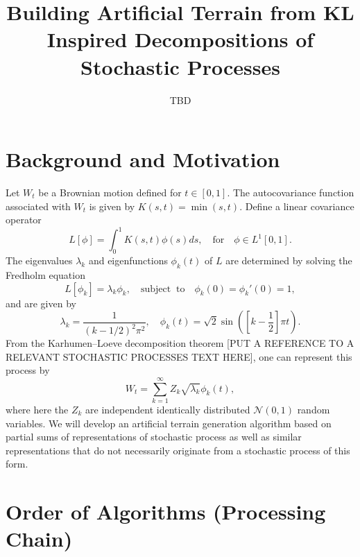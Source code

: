 \documentclass{amsart}
\title{Building Artificial Terrain from KL Inspired Decompositions of Stochastic Processes}
\author{TBD}
\begin{document}
\maketitle

\section{Background and Motivation}

Let $W_t$ be a Brownian motion defined for $t\in[0,1]$.  The autocovariance function 
associated with $W_t$ is given by $K(s,t)=\min(s,t)$.  Define a linear covariance operator
%
\begin{equation}
    L[\phi]=\int_0^1K(s,t)\phi(s)ds, \quad\mathrm{for}\quad \phi\in L^1[0,1].
\end{equation}
%
The eigenvalues $\lambda_k$ and eigenfunctions $\phi_k(t)$ of $L$ are determined by solving 
the Fredholm equation
%
\begin{equation}
    L[\phi_k] = \lambda_k\phi_k,\quad\mathrm{subject\;\;to}\quad \phi_k(0)=\phi_k'(0)=1,
\end{equation}
%
and are given by
%
\begin{equation}
    \lambda_k = \frac{1}{(k-1/2)^2\pi^2},\quad 
    \phi_k(t) = \sqrt{2}\sin\left(\left[k-\frac{1}{2}\right]\pi t\right).
\end{equation}
%
From the Karhumen--Loeve decomposition theorem [PUT A REFERENCE TO A RELEVANT 
STOCHASTIC PROCESSES TEXT HERE],
one can represent this process by
%
\begin{equation}
    W_t = \sum_{k=1}^\infty Z_k \sqrt{\lambda_k}\phi_k(t), \label{proc}
\end{equation}
%
where here the $Z_k$ are independent identically distributed $\mathcal{N}(0,1)$ 
random variables. We will develop an artificial terrain generation algorithm based 
on partial sums of representations of stochastic process as well as similar representations
that do not necessarily originate from a stochastic process of this form.

\section{Order of Algorithms (Processing Chain)}
\end{document}
